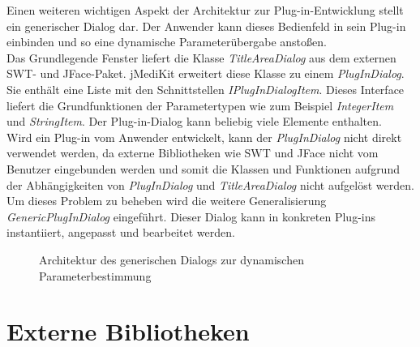 Einen weiteren wichtigen Aspekt der Architektur zur Plug-in-Entwicklung stellt ein generischer Dialog dar. Der Anwender kann dieses Bedienfeld in sein Plug-in einbinden und so eine dynamische Parameterübergabe anstoßen.\\
Das Grundlegende Fenster liefert die Klasse \textit{TitleAreaDialog} aus dem externen SWT- und JFace-Paket. jMediKit erweitert diese Klasse zu einem \textit{PlugInDialog}. Sie enthält eine Liste mit den Schnittstellen \textit{IPlugInDialogItem}. Dieses  Interface liefert die Grundfunktionen der Parametertypen wie zum Beispiel \textit{IntegerItem} und \textit{StringItem}. Der Plug-in-Dialog kann beliebig viele Elemente enthalten.\\
Wird ein Plug-in vom Anwender entwickelt, kann der \textit{PlugInDialog} nicht direkt verwendet werden, da externe Bibliotheken wie SWT und JFace nicht vom Benutzer eingebunden werden und somit die Klassen und Funktionen aufgrund der Abhängigkeiten von \textit{PlugInDialog} und \textit{TitleAreaDialog} nicht aufgelöst werden.
Um dieses Problem zu beheben wird die weitere Generalisierung \textit{GenericPlugInDialog} eingeführt. Dieser Dialog kann in konkreten Plug-ins instantiiert, angepasst und bearbeitet werden.

\begin{figure}[htbp]
  \vspace{0.5cm}
  \centering
  \caption{Architektur des generischen Dialogs zur dynamischen Parameterbestimmung}
  \label{plugindialog}
  \vspace{0.5cm}
\end{figure}

\section{Externe Bibliotheken}

